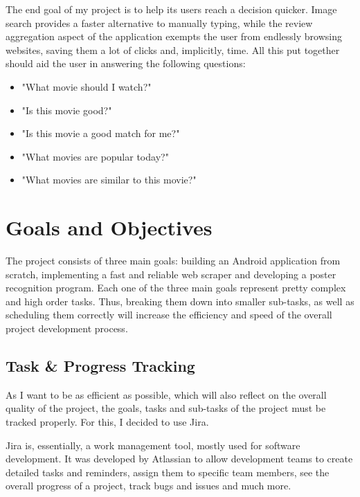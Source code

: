 \documentclass[12pt,a4paper,twoside]{report}
\begin{document}
The end goal of my project is to help its users reach a decision quicker. Image search provides a faster alternative to manually typing, while the review aggregation aspect of the application exempts the user from endlessly browsing websites, saving them a lot of clicks and, implicitly, time. All this put together should aid the user in answering the following questions:
    \begin{itemize}
        \item "What movie should I watch?"
        \item "Is this movie good?"
        \item "Is this movie a good match for me?"
        \item "What movies are popular today?"
        \item "What movies are similar to this movie?"
    \end{itemize}
    

\section{Goals and Objectives}

The project consists of three main goals: building an Android application from scratch, implementing a fast and reliable web scraper and developing a poster recognition program. Each one of the three main goals represent pretty complex and high order tasks. Thus, breaking them down into smaller sub-tasks, as well as scheduling them correctly will increase the efficiency and speed of the overall project development process.

\subsection{Task \& Progress Tracking}

As I want to be as efficient as possible, which will also reflect on the overall quality of the project, the goals, tasks and sub-tasks of the project must be tracked properly. For this, I decided to use Jira.

Jira is, essentially, a work management tool, mostly used for software development. It was developed by Atlassian to allow development teams to create detailed tasks and reminders, assign them to specific team members, see the overall progress of a project, track bugs and issues and much more. 
\end{document}
